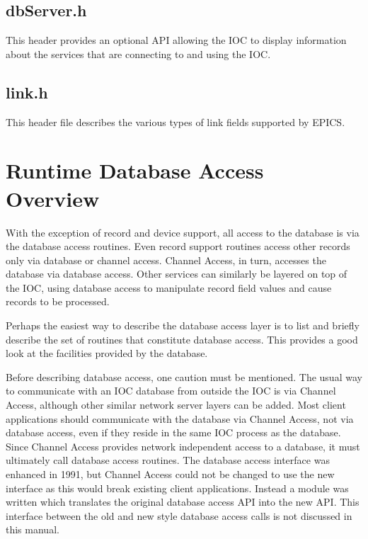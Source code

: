 \subsection{dbServer.h}

This header provides an optional API allowing the IOC to display information about the services that are connecting to and using the IOC.

\subsection{link.h}

This header file describes the various types of link fields supported by EPICS.

\section{Runtime Database Access Overview}

With the exception of record and device support, all access to the database is via the database access routines.
Even record support routines access other records only via database or channel access.
Channel Access, in turn, accesses the database via database access.
Other services can similarly be layered on top of the IOC, using database access to manipulate record field values and cause records to be processed.

Perhaps the easiest way to describe the database access layer is to list and briefly describe the set of routines that constitute database access.
This provides a good look at the facilities provided by the database.

Before describing database access, one caution must be mentioned.
The usual way to communicate with an IOC database from outside the IOC is via Channel Access, although other similar network server layers can be added.
Most client applications should communicate with the database via Channel Access, not via database access, even if they reside in the same IOC process as the database.
Since Channel Access provides network independent access to a database, it must ultimately call database access routines.
The database access interface was enhanced in 1991, but Channel Access could not be changed to use the new interface as this would break existing client applications.
Instead a module was written which translates the original database access API into the new API.
This interface between the old and new style database access calls is not discussed in this manual.

